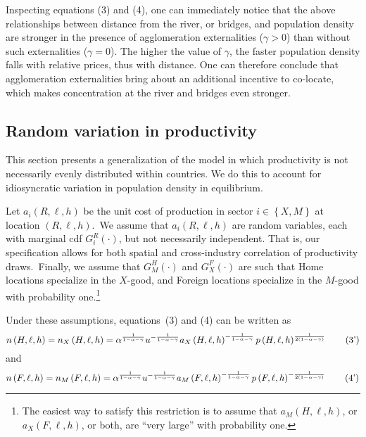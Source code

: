 \documentclass[12pt]{article}
\begin{document}
Inspecting equations (3) and (4), one can immediately notice that the above 
relationships between distance from the river, or bridges, and population density 
are stronger in the presence of agglomeration externalities ($\gamma > 0$) than 
without such externalities ($\gamma = 0$). The higher the value of $\gamma$, the 
faster population density falls with relative prices, thus with distance. One can 
therefore conclude that agglomeration externalities bring about an additional 
incentive to co-locate, which makes concentration at the river and bridges even stronger.

\subsection{Random variation in productivity}

This section presents a generalization of the model in which productivity is
not necessarily evenly distributed within countries. We do this to account for idiosyncratic variation in population density in equilibrium.

Let $a_{i}\left( R,\ell
,h\right) $ be the unit cost of production in sector $i\in \left \{
X,M\right \} $ at location $\left( R,\ell ,h\right) $.\ We assume that $%
a_{i}\left( R,\ell ,h\right) $ are random variables, each with marginal cdf $%
G_{i}^{R}\left( \cdot \right) $, but not necessarily independent. That is,
our specification allows for both spatial and cross-industry correlation of
productivity draws.\ Finally, we assume that $G_{M}^{H}\left( \cdot \right) $
and $G_{X}^{F}\left( \cdot \right) $ are such that Home locations specialize
in the $X$-good, and Foreign locations specialize in the $M$-good with
probability one.\footnote{%
The easiest way to satisfy this restriction is to assume that $a_{M}\left(
H,\ell ,h\right) $, or $a_{X}\left( F,\ell ,h\right) $, or both, are ``very
large'' with probability one.}

Under these assumptions, equations\ (3) and (4) can be written as%
\begin{equation}
n\left( H,\ell ,h\right) =n_{X}\left( H,\ell ,h\right) =\alpha ^{\frac{1}{%
1-\alpha-\gamma }} u^{-\frac{1}{1-\alpha-\gamma }}a_{X}\left( H,\ell
,h\right) ^{-\frac{1}{1-\alpha-\gamma }}p\left( H,\ell ,h\right) ^{\frac{1}{2\left(
1-\alpha-\gamma \right) }}  \tag{3'}
\end{equation}%
and%
\begin{equation}
n\left( F,\ell ,h\right) =n_{M}\left( F,\ell ,h\right) =\alpha ^{\frac{1}{%
1-\alpha-\gamma }}u^{-\frac{1}{1-\alpha-\gamma }}a_{M}\left( F,\ell
,h\right) ^{-\frac{1}{1-\alpha-\gamma }}p\left( F,\ell ,h\right) ^{-\frac{1}{%
2\left( 1-\alpha-\gamma \right) }}  \tag{4'}
\end{equation}
\end{document}
